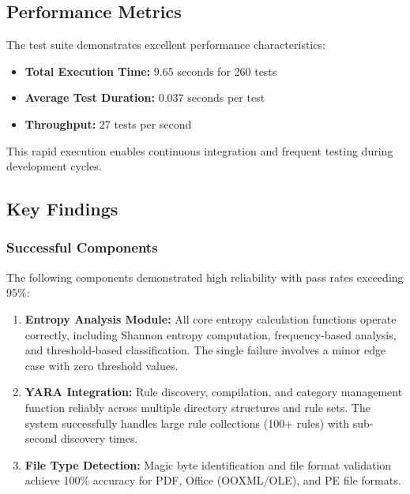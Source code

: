 \subsection{Performance Metrics}

The test suite demonstrates excellent performance characteristics:

\begin{itemize}
    \item \textbf{Total Execution Time:} 9.65 seconds for 260 tests
    \item \textbf{Average Test Duration:} 0.037 seconds per test
    \item \textbf{Throughput:} 27 tests per second
\end{itemize}

This rapid execution enables continuous integration and frequent testing during development cycles.

\subsection{Key Findings}

\subsubsection{Successful Components}

The following components demonstrated high reliability with pass rates exceeding 95\%:

\begin{enumerate}
    \item \textbf{Entropy Analysis Module:} All core entropy calculation functions operate correctly, including Shannon entropy computation, frequency-based analysis, and threshold-based classification. The single failure involves a minor edge case with zero threshold values.
    
    \item \textbf{YARA Integration:} Rule discovery, compilation, and category management function reliably across multiple directory structures and rule sets. The system successfully handles large rule collections (100+ rules) with sub-second discovery times.
    
    \item \textbf{File Type Detection:} Magic byte identification and file format validation achieve 100\% accuracy for PDF, Office (OOXML/OLE), and PE file formats.
\end{enumerate}

